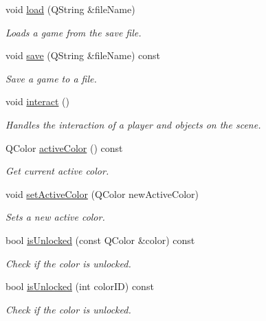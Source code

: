 \begin{DoxyCompactItemize}
void \hyperlink{class_spectrum_game_a46b514f657f13b2c4fa20402a4e44c72}{load} (Q\+String \&file\+Name)
\begin{DoxyCompactList}\small\item\em Loads a game from the save file. \end{DoxyCompactList}\item 
void \hyperlink{class_spectrum_game_a55bb099940b204796a5f406b3a69de79}{save} (Q\+String \&file\+Name) const
\begin{DoxyCompactList}\small\item\em Save a game to a file. \end{DoxyCompactList}\item 
\mbox{\label{class_spectrum_game_a479951533ca641e0da457e1403212829}} 
void \hyperlink{class_spectrum_game_a479951533ca641e0da457e1403212829}{interact} ()
\begin{DoxyCompactList}\small\item\em Handles the interaction of a player and objects on the scene. \end{DoxyCompactList}\item 
Q\+Color \hyperlink{class_spectrum_game_a8c40ad9ead765c9d5be4ef716edf6cd4}{active\+Color} () const
\begin{DoxyCompactList}\small\item\em Get current active color. \end{DoxyCompactList}\item 
void \hyperlink{class_spectrum_game_a59123ee548a9d6fb476e7c511e7f497a}{set\+Active\+Color} (Q\+Color new\+Active\+Color)
\begin{DoxyCompactList}\small\item\em Sets a new active color. \end{DoxyCompactList}\item 
bool \hyperlink{class_spectrum_game_a0b95f601a2eb6a31baf10b6d37e38a2c}{is\+Unlocked} (const Q\+Color \&color) const
\begin{DoxyCompactList}\small\item\em Check if the color is unlocked. \end{DoxyCompactList}\item 
bool \hyperlink{class_spectrum_game_a36ec9500dcbb54607fdd667c2ee796ed}{is\+Unlocked} (int color\+ID) const
\begin{DoxyCompactList}\small\item\em Check if the color is unlocked. \end{DoxyCompactList}\item 

\end{DoxyCompactItemize}
